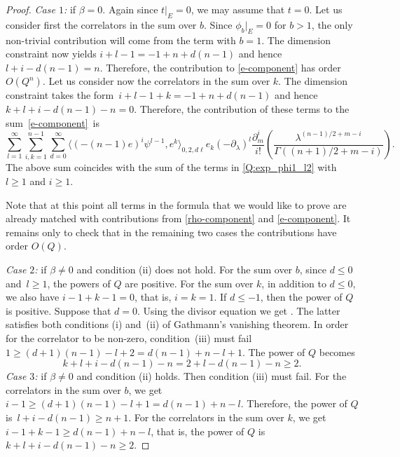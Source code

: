 \documentclass[10pt,a4paper]{article}
\numberwithin{equation}{section}
\begin{document}
\begin{proof}
{\em Case $1$:} if $\beta=0$. Again since $t|_E=0$, we may assume that $t=0$. Let us consider first the correlators in the sum over $b$. Since $\phi_b|_{E}=0$ for $b>1$, the only non-trivial contribution will come from the term with $b=1$. The dimension constraint now yields
$i+l-1 = -1 + n + d(n-1)$ and hence $l+i-d(n-1)=n$. Therefore, the contribution to \eqref{e-component} has order $O(Q^n)$. Let us consider now the correlators in the sum over $k$. The dimension constraint takes the form~$i+l-1+k=-1+n+d(n-1)$ and hence $k+l+i-d(n-1)-n=0$. Therefore, the contribution of these terms to the sum~\eqref{e-component}~is
\[
\sum_{l=1}^\infty
\sum_{i,k=1}^{n-1}
\sum_{d=0}^\infty
\big\langle (-(n-1)e)^i \psi^{l-1}, e^k
\big\rangle_{0,2,d\ell} e_k
(-\partial_\lambda)^l
\frac{\partial_m^i}{i!}\left(
\frac{\lambda^{(n-1)/2+m-i}}{
\Gamma((n+1)/2+m-i)}
\right).
\]
The above sum coincides with the sum of the terms in \eqref{Q:exp_phi1_l2} with $l\geq 1$ and $i\geq 1$.

Note that at this point all terms in the formula that we would like to prove are already matched with contributions from \eqref{rho-component} and \eqref{e-component}. It remains only to check that in the remaining two cases the contributions have order $O(Q)$.

{\em Case $2$:} if $\beta\neq 0$ and condition (ii) does not hold. For the sum over $b$, since $d\leq 0$ and~$l\geq 1$, the powers of $Q$ are positive. For the sum over $k$, in addition to $d\leq 0$, we also have ${i-1+k-1=0}$, that is, $i=k=1$. If $d\leq -1$, then the power of $Q$ is positive. Suppose that $d=0$. Using the divisor equation we get . The latter satisfies both conditions (i) and~(ii) of Gathmann's vanishing theorem. In order for the correlator to be non-zero, condition~(iii) must fail $1\geq (d+1)(n-1)-l+2=d(n-1)+n-l+1$. The power of $Q$ becomes
\[
k+l+i-d(n-1)-n = 2+l-d(n-1)-n \geq 2.
\]
{\em Case $3$:} if $\beta\neq 0$ and condition (ii) holds. Then condition (iii) must fail. For the correlators in the sum over $b$, we get
$i-1\geq (d+1)(n-1)-l+1 =d(n-1) + n-l$.
Therefore, the power of $Q$ is~$l+i-d(n-1)\geq n+1$. For the correlators in the sum over $k$, we get
$i-1+k-1\geq d(n-1) + n-l$, that is, the power of $Q$ is $k+l+i-d(n-1)-n\geq 2$.
\end{proof}
\end{document}
